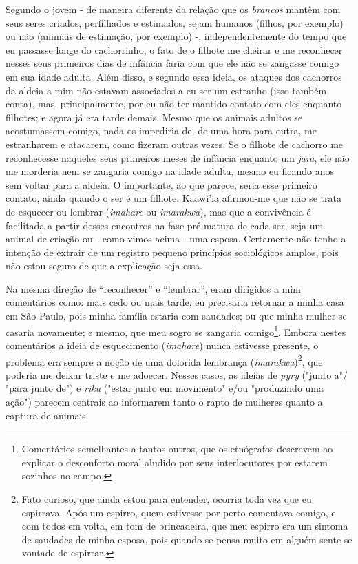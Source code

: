 Segundo o jovem - de maneira diferente da relação que os \emph{brancos}
mantêm com seus seres criados, perfilhados e estimados, sejam humanos
(filhos, por exemplo) ou não (animais de estimação, por exemplo) -,
independentemente do tempo que eu passasse longe do cachorrinho, o fato
de o filhote me cheirar e me reconhecer nesses seus primeiros dias de
infância faria com que ele não se zangasse comigo em sua idade adulta.
Além disso, e segundo essa ideia, os ataques dos cachorros da aldeia a
mim não estavam associados a eu ser um estranho (isso também conta),
mas, principalmente, por eu não ter mantido contato com eles enquanto
filhotes; e agora já era tarde demais. Mesmo que os animais adultos se
acostumassem comigo, nada os impediria de, de uma hora para outra, me
estranharem e atacarem, como fizeram outras vezes. Se o filhote de
cachorro me reconhecesse naqueles seus primeiros meses de infância
enquanto um \emph{jara}, ele não me morderia nem se zangaria comigo na
idade adulta, mesmo eu ficando anos sem voltar para a aldeia. O
importante, ao que parece, seria esse primeiro contato, ainda quando o
ser é um filhote. Kaawi'ia afirmou-me que não se trata de esquecer ou
lembrar (\emph{imahare} ou \emph{imarakwa}), mas que a convivência é
facilitada a partir desses encontros na fase pré-matura de cada ser,
seja um animal de criação ou - como vimos acima - uma esposa. Certamente
não tenho a intenção de extrair de um registro pequeno princípios
sociológicos amplos, pois não estou seguro de que a explicação seja
essa.

Na mesma direção de ``reconhecer'' e ``lembrar'', eram dirigidos a mim
comentários como: mais cedo ou mais tarde, eu precisaria retornar a
minha casa em São Paulo, pois minha família estaria com saudades; ou que
minha mulher se casaria novamente; e mesmo, que meu sogro se zangaria
comigo\footnote{Comentários semelhantes a tantos outros, que os
  etnógrafos descrevem ao explicar o desconforto moral aludido por seus
  interlocutores por estarem sozinhos no campo.}. Embora nestes
comentários a ideia de esquecimento (\emph{imahare}) nunca estivesse
presente, o problema era sempre a noção de uma dolorida lembrança
(\emph{imarakwa})\footnote{Fato curioso, que ainda estou para entender,
  ocorria toda vez que eu espirrava. Após um espirro, quem estivesse por
  perto comentava comigo, e com todos em volta, em tom de brincadeira,
  que meu espirro era um sintoma de saudades de minha esposa, pois
  quando se pensa muito em alguém sente-se vontade de espirrar.}, que
poderia me deixar triste e me adoecer. Nesses casos, as ideias de
\emph{pyry} ("junto a"/ "para junto de") e \emph{riku} ("estar junto em
movimento" e/ou "produzindo uma ação") parecem centrais ao informarem
tanto o rapto de mulheres quanto a captura de animais.


